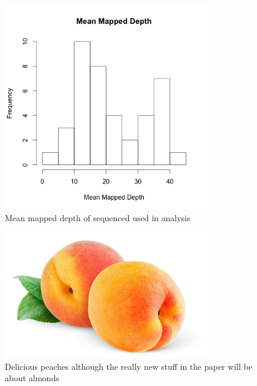 \documentclass[12pt]{article}
\newcommand{\beginsupplement}{%
        \setcounter{table}{0}
        \renewcommand{\thetable}{S\arabic{table}}%
        \setcounter{figure}{0}
        \renewcommand{\thefigure}{S\arabic{figure}}%
     }
\begin{document}
\pagebreak

%
%
%
\pagebreak
\begin{figure}[b]
\centering
   \includegraphics[width=0.8\textwidth]{depthBQ20MQ30.png}
  \caption{Mean mapped depth of sequenced used in analysis}
  \label{fig:depth}
\end{figure}

\begin{figure}[b]
\centering
   \includegraphics[width=0.8\textwidth]{peachzdfgad.jpg}
  \caption{Delicious peaches although the really new stuff in the paper will be about almonds}
  \label{fig:peach}
\end{figure}
%
\pagebreak
\beginsupplement
\end{document}
